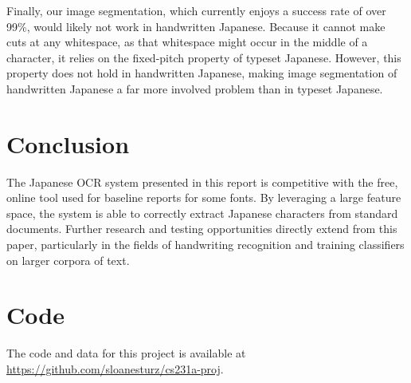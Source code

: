 \documentclass[10pt,twocolumn,letterpaper]{article}
\begin{document}
Finally, our image segmentation, which currently enjoys a success rate of over 99\%, would likely not work in handwritten Japanese. Because it cannot make cuts at any whitespace, as that whitespace might occur in the middle of a character, it relies on the fixed-pitch property of typeset Japanese. However, this property does not hold in handwritten Japanese, making image segmentation of handwritten Japanese a far more involved problem than in typeset Japanese.


\section{Conclusion}
The Japanese OCR system presented in this report is competitive with the free, online tool used for baseline reports for some fonts. By leveraging a large feature space, the system is able to correctly extract Japanese characters from standard documents. Further research and testing opportunities directly extend from this paper, particularly in the fields of handwriting recognition and training classifiers on larger corpora of text.

\section{Code}
The code and data for this project is available at \url{https://github.com/sloanesturz/cs231a-proj}.\\
\newline
\end{document}
